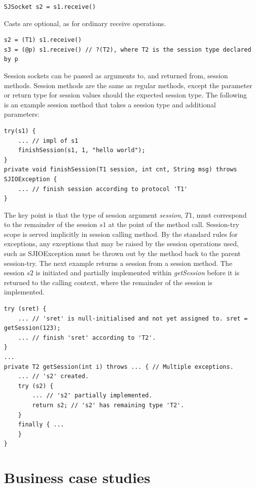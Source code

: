 \begin{lstlisting}
SJSocket s2 = s1.receive()
\end{lstlisting}

Casts are optional, as for ordinary receive operations.

\begin{lstlisting}
s2 = (T1) s1.receive()
s3 = (@p) s1.receive() // ?(T2), where T2 is the session type declared by p
\end{lstlisting}

Session sockets can be passed as arguments to, and returned from, session methods. Session methods are the same as regular methods, except the parameter or return type for session values should the expected session type. The following is an example session method that takes a session type and additional parameters:

\begin{lstlisting}
try(s1) {
    ... // impl of s1
    finishSession(s1, 1, "hello world");
}
private void finishSession(T1 session, int cnt, String msg) throws SJIOException {
    ... // finish session according to protocol 'T1' 
}
\end{lstlisting}

The key point is that the type of session argument \textit{session}, $T1$, must correspond to the remainder of the session $s1$ at the point of the method call. Session-try scope is served implicitly in session calling method. By the standard rules for exceptions, any exceptions that may be raised by the session operations used, such as SJIOException must be thrown out by the method back to the parent session-try. The next example returns a session from a session method. The session $s2$ is initiated and partially implemented within \textit{getSession} before it is returned to the calling context, where the remainder of the session is implemented.

\begin{lstlisting}
try (sret) {
    ... // 'sret' is null-initialised and not yet assigned to. sret = getSession(123);
    ... // finish 'sret' according to 'T2'.
}
...
private T2 getSession(int i) throws ... { // Multiple exceptions.
    ... // 's2' created. 
    try (s2) {
        ... // 's2' partially implemented.
        return s2; // 's2' has remaining type 'T2'. 
    }
    finally { ...
    }
}
\end{lstlisting}


\section{Business case studies}
\label{sec:scenarios}

